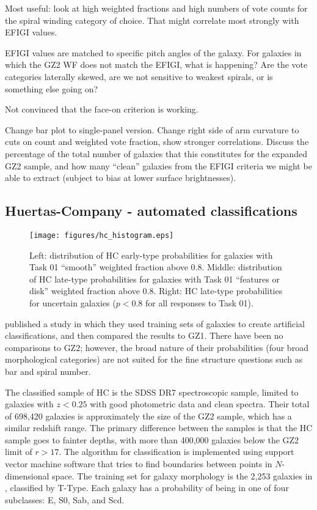 \documentclass[useAMS,usenatbib]{mn2e}
\begin{document}
Most useful: look at high weighted fractions and high numbers of vote counts for the spiral winding category of choice. That might correlate most strongly with EFIGI values. 

EFIGI values are matched to specific pitch angles of the galaxy. For galaxies in which the GZ2 WF does not match the EFIGI, what is happening? Are the vote categories laterally skewed, are we not sensitive to weakest spirals, or is something else going on?

Not convinced that the face-on criterion is working. 

Change bar plot to single-panel version. Change right side of arm curvature to cuts on count and weighted vote fraction, show stronger correlations. Discuss the percentage of the total number of galaxies that this constitutes for the expanded GZ2 sample, and how many ``clean'' galaxies from the EFIGI criteria we might be able to extract (subject to bias at lower surface brightnesses).

\subsection{Huertas-Company - automated classifications}

\begin{figure*}
\texttt{[image: figures/hc\_histogram.eps]}
\caption{Left: distribution of HC early-type probabilities for galaxies with Task 01 ``smooth'' weighted fraction above 0.8. Middle: distribution of HC late-type probabilities for galaxies with Task 01 ``features or disk'' weighted fraction above 0.8. Right: HC late-type probabilities for uncertain galaxies ($p<0.8$ for all responses to Task 01). 
\label{fig-hc_histogram}}
\end{figure*}

\citet{hue11} published a study in which they used training sets of galaxies to create artificial classifications, and then compared the results to GZ1. There have been no comparisons to GZ2; however, the broad nature of their probabilities (four broad morphological categories) are not suited for the fine structure questions such as bar and spiral number. 

The classified sample of HC is the SDSS DR7 spectroscopic sample, limited to galaxies with $z<0.25$ with good photometric data and clean spectra. Their total of 698,420 galaxies is approximately the size of the GZ2 sample, which has a similar redshift range. The primary difference between the samples is that the HC sample goes to fainter depths, with more than 400,000 galaxies below the GZ2 limit of $r>17$. The algorithm for classification is implemented using support vector machine software that tries to find boundaries between points in $N$-dimensional space. The training set for galaxy morphology is the 2,253 galaxies in \citet{fuk07}, classified by T-Type. Each galaxy has a probability of being in one of four subclasses: E, S0, Sab, and Scd. 
\end{document}

